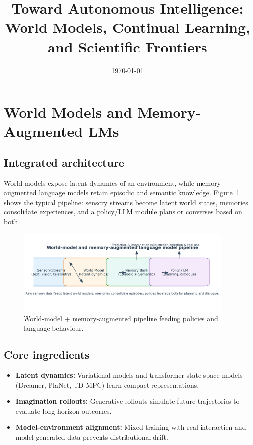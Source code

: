 \documentclass{article}
\title{Toward Autonomous Intelligence: World Models, Continual Learning, and Scientific Frontiers}
\author{}
\date{\today}
\begin{document}
\maketitle

\section{World Models and Memory-Augmented LMs}
\subsection{Integrated architecture}
World models expose latent dynamics of an environment, while memory-augmented language models retain episodic and semantic knowledge. Figure~\ref{fig:world_model_pipeline_en} shows the typical pipeline: sensory streams become latent world states, memories consolidate experiences, and a policy/LLM module plans or converses based on both.
\begin{figure}[H]
  \centering
  \includegraphics[width=0.95\textwidth]{world_model_pipeline.png}
  \caption{World-model + memory-augmented pipeline feeding policies and language behaviour.}
  \label{fig:world_model_pipeline_en}
\end{figure}

\subsection{Core ingredients}
\begin{itemize}
  \item \textbf{Latent dynamics:} Variational models and transformer state-space models (Dreamer, PlaNet, TD-MPC) learn compact representations.
  \item \textbf{Imagination rollouts:} Generative rollouts simulate future trajectories to evaluate long-horizon outcomes.
  \item \textbf{Model-environment alignment:} Mixed training with real interaction and model-generated data prevents distributional drift.
\end{itemize}
\end{document}

